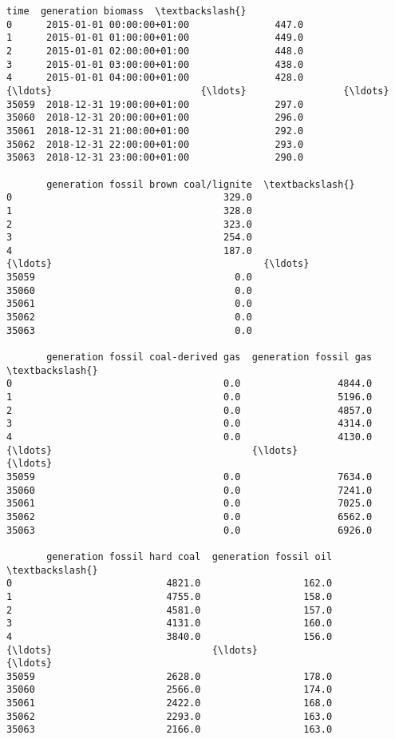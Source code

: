 \documentclass[11pt]{article}
\makeatletter
\newcommand{\boxspacing}{\kern\kvtcb@left@rule\kern\kvtcb@boxsep}
\newcommand{\prompt}[4]{
        {\ttfamily\llap{{\color{#2}[#3]:\hspace{3pt}#4}}\vspace{-\baselineskip}}
    }
\makeatother
\begin{document}
            \begin{tcolorbox}[breakable, size=fbox, boxrule=.5pt, pad at break*=1mm, opacityfill=0]
\prompt{Out}{outcolor}{2}{\boxspacing}
\begin{Verbatim}[commandchars=\\\{\}]
                            time  generation biomass  \textbackslash{}
0      2015-01-01 00:00:00+01:00               447.0
1      2015-01-01 01:00:00+01:00               449.0
2      2015-01-01 02:00:00+01:00               448.0
3      2015-01-01 03:00:00+01:00               438.0
4      2015-01-01 04:00:00+01:00               428.0
{\ldots}                          {\ldots}                 {\ldots}
35059  2018-12-31 19:00:00+01:00               297.0
35060  2018-12-31 20:00:00+01:00               296.0
35061  2018-12-31 21:00:00+01:00               292.0
35062  2018-12-31 22:00:00+01:00               293.0
35063  2018-12-31 23:00:00+01:00               290.0

       generation fossil brown coal/lignite  \textbackslash{}
0                                     329.0
1                                     328.0
2                                     323.0
3                                     254.0
4                                     187.0
{\ldots}                                     {\ldots}
35059                                   0.0
35060                                   0.0
35061                                   0.0
35062                                   0.0
35063                                   0.0

       generation fossil coal-derived gas  generation fossil gas  \textbackslash{}
0                                     0.0                 4844.0
1                                     0.0                 5196.0
2                                     0.0                 4857.0
3                                     0.0                 4314.0
4                                     0.0                 4130.0
{\ldots}                                   {\ldots}                    {\ldots}
35059                                 0.0                 7634.0
35060                                 0.0                 7241.0
35061                                 0.0                 7025.0
35062                                 0.0                 6562.0
35063                                 0.0                 6926.0

       generation fossil hard coal  generation fossil oil  \textbackslash{}
0                           4821.0                  162.0
1                           4755.0                  158.0
2                           4581.0                  157.0
3                           4131.0                  160.0
4                           3840.0                  156.0
{\ldots}                            {\ldots}                    {\ldots}
35059                       2628.0                  178.0
35060                       2566.0                  174.0
35061                       2422.0                  168.0
35062                       2293.0                  163.0
35063                       2166.0                  163.0


\end{Verbatim}
\end{tcolorbox}
\end{document}
